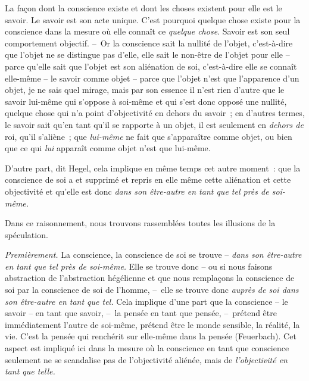 \documentclass[french,twoside]{book} %
\begin{document}
La façon dont la conscience existe et dont les choses existent pour elle est le savoir. Le savoir est son acte unique. C’est pourquoi quelque chose existe pour la conscience dans la mesure où elle connaît ce \emph{quelque chose}. Savoir est son seul comportement objectif. – Or la conscience sait la nullité de l’objet, c’est-à-dire que l’objet ne se distingue pas d’elle, elle sait le non-être de l’objet pour elle – parce qu’elle sait que l’objet est son aliénation de soi, c’est-à-dire elle se connaît elle-même – le savoir comme objet – parce que l’objet n’est que l’apparence d’un objet, je ne sais quel mirage, mais par son essence il n’est rien d’autre que le savoir lui-même qui s’oppose à soi-même et qui s’est donc opposé une nullité, quelque chose qui n’a point d’objectivité en dehors du savoir ; en d’autres termes, le savoir sait qu’en tant qu’il se rapporte à un objet, il est seulement en \emph{dehors de} roi, qu’il s’aliène ; que \emph{lui-même} ne fait que s’apparaître comme objet, ou bien que ce qui \emph{lui} apparaît comme objet n’est que lui-même.\par
D’autre part, dit Hegel, cela implique en même temps cet autre moment : que la conscience de soi a et supprimé et repris en elle même cette aliénation et cette objectivité et qu’elle est donc \emph{dans son être-autre en tant que tel près de soi-même.}\par
Dans ce raisonnement, nous trouvons rassemblées toutes les illusions de la spéculation.\par
\emph{Premièrement.} La conscience, la conscience de soi se trouve – \emph{dans son être-autre en tant que tel près de soi-même.} Elle se trouve donc – ou si nous faisons abstraction de l’abstraction hégélienne et que nous remplaçons la conscience de soi par la conscience de soi de l’homme, – elle se trouve donc \emph{auprès de soi dans son être-autre en tant que tel.} Cela implique d’une part que la conscience – le savoir – en tant que savoir, – la pensée en tant que pensée, – prétend être immédiatement l’autre de soi-même, prétend être le monde sensible, la réalité, la vie. C’est la pensée qui renchérit sur elle-même dans la pensée (Feuerbach). Cet aspect est impliqué ici dans la mesure où la conscience en tant que conscience seulement ne se scandalise pas de l’objectivité aliénée, mais de \emph{l’objectivité en tant que telle.}\par
\end{document}
